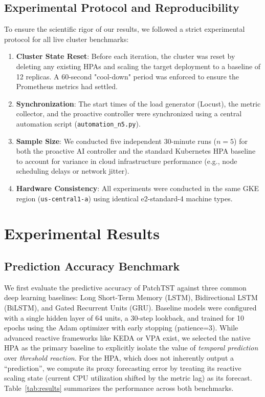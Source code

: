 \documentclass[conference]{IEEEtran}
\begin{document}
\subsection{Experimental Protocol and Reproducibility}
To ensure the scientific rigor of our results, we followed a strict experimental protocol for all live cluster benchmarks:

\begin{enumerate}
    \item \textbf{Cluster State Reset}: Before each iteration, the cluster was reset by deleting any existing HPAs and scaling the target deployment to a baseline of 12 replicas. A 60-second "cool-down" period was enforced to ensure the Prometheus metrics had settled.
    \item \textbf{Synchronization}: The start times of the load generator (Locust), the metric collector, and the proactive controller were synchronized using a central automation script (\texttt{automation\_n5.py}).
    \item \textbf{Sample Size}: We conducted five independent 30-minute runs ($n=5$) for both the proactive AI controller and the standard Kubernetes HPA baseline to account for variance in cloud infrastructure performance (e.g., node scheduling delays or network jitter).
    \item \textbf{Hardware Consistency}: All experiments were conducted in the same GKE region (\texttt{us-central1-a}) using identical e2-standard-4 machine types.
\end{enumerate}

\section{Experimental Results}\label{sec:results}

\subsection{Prediction Accuracy Benchmark}
We first evaluate the predictive accuracy of PatchTST against three common deep learning baselines: Long Short-Term Memory (LSTM), Bidirectional LSTM (BiLSTM), and Gated Recurrent Units (GRU). Baseline models were configured with a single hidden layer of 64 units, a 30-step lookback, and trained for 10 epochs using the Adam optimizer with early stopping (patience=3). While advanced reactive frameworks like KEDA or VPA exist, we selected the native HPA as the primary baseline to explicitly isolate the value of \textit{temporal prediction} over \textit{threshold reaction}. For the HPA, which does not inherently output a ``prediction'', we compute its proxy forecasting error by treating its reactive scaling state (current CPU utilization shifted by the metric lag) as its forecast. Table~\ref{tab:results} summarizes the performance across both benchmarks.
\end{document}
